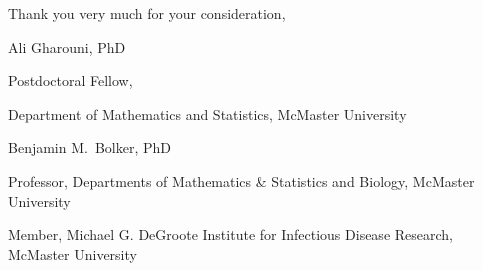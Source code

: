 \documentclass[12pt,letterpaper]{letter}
\newcommand{\journalname}{\emph{PeerJ Life \& Environment}\xspace}
\begin{document}

Thank you very much for your consideration,

\begin{flushleft}
\footnotesize

Ali Gharouni, PhD
\setlength{\parskip}{0em}

Postdoctoral Fellow, 

Department of Mathematics and Statistics, McMaster University

\vspace{1em}

Benjamin M.\ Bolker, PhD

Professor, Departments of Mathematics \& Statistics and Biology, McMaster University

Member, Michael G. DeGroote Institute for Infectious Disease Research, McMaster University

\end{flushleft}

\thispagestyle{empty}
\end{document}
